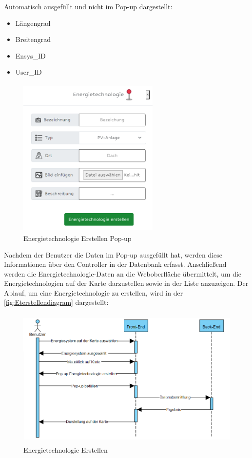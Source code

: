 Automatisch ausgefüllt und nicht im Pop-up dargestellt:
\begin{itemize}
	\item Längengrad 
	\item Breitengrad
	\item Ensys\_ID
	\item User\_ID
\end{itemize}
\begin{figure}[h]
	\centering
	\includegraphics[height=8cm,width=7cm]{images/ETerstellenPop}
	\caption{Energietechnologie Erstellen Pop-up}
	\label{fig:EterstellenPop}
\end{figure}
\newpage
Nachdem der Benutzer die Daten im Pop-up ausgefüllt hat, werden diese Informationen über den Controller in der Datenbank erfasst. Anschließend werden die Energietechnologie-Daten an die Weboberfläche übermittelt, um die Energietechnologien auf der Karte darzustellen sowie in der Liste anzuzeigen. Der Ablauf, um eine Energietechnologie zu erstellen, wird in der \autoref{fig:Eterstellendiagram} dargestellt:
 \begin{figure}[h]
 	\centering
 	\includegraphics[height=7cm,width=14cm]{images/ETerstellen}
 	\caption{Energietechnologie Erstellen}
 	\label{fig:Eterstellendiagram}
 \end{figure}

